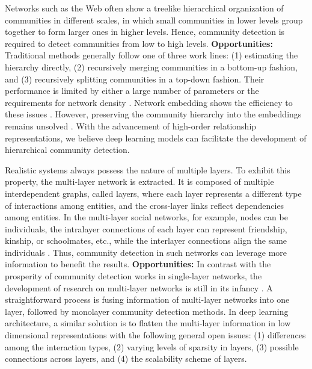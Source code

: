 Networks such as the Web often show a treelike hierarchical organization of communities in different scales, in which small communities in lower levels group together to form larger ones in higher levels. Hence, community detection is required to detect communities from low to high levels.
\vspace{2mm}
\noindent
\textbf{Opportunities:} Traditional methods generally follow one of three work lines: (1) estimating the hierarchy directly, (2) recursively merging communities in a bottom-up fashion, and (3) recursively splitting communities in a top-down fashion. Their performance is limited by either a large number of parameters or the requirements for network density . Network embedding shows the efficiency to these issues . However, preserving the community hierarchy into the embeddings remains unsolved . With the advancement of high-order relationship representations, we believe deep learning models can facilitate the development of hierarchical community detection.

Realistic systems always possess the nature of multiple layers. To exhibit this property, the multi-layer network is extracted. It is composed of multiple interdependent graphs, called layers, where each layer represents a different type of interactions among entities, and the cross-layer links reflect dependencies among entities. In the multi-layer social networks, for example, nodes can be individuals, the intralayer connections of each layer can represent friendship, kinship, or schoolmates, etc., while the interlayer connections align the same individuals . Thus, community detection in such networks can leverage more information to benefit the results. 
\vspace{2mm}
\noindent
\textbf{Opportunities:} In contrast with the prosperity of community detection works in single-layer networks, the development of research on multi-layer networks is still in its infancy . A straightforward process is fusing information of multi-layer networks into one layer, followed by monolayer community detection methods. In deep learning architecture, a similar solution is to flatten the multi-layer information in low dimensional representations with the following general open issues: (1) differences among the interaction types, (2) varying levels of sparsity in layers, (3) possible connections across layers, and (4) the scalability scheme of layers.

